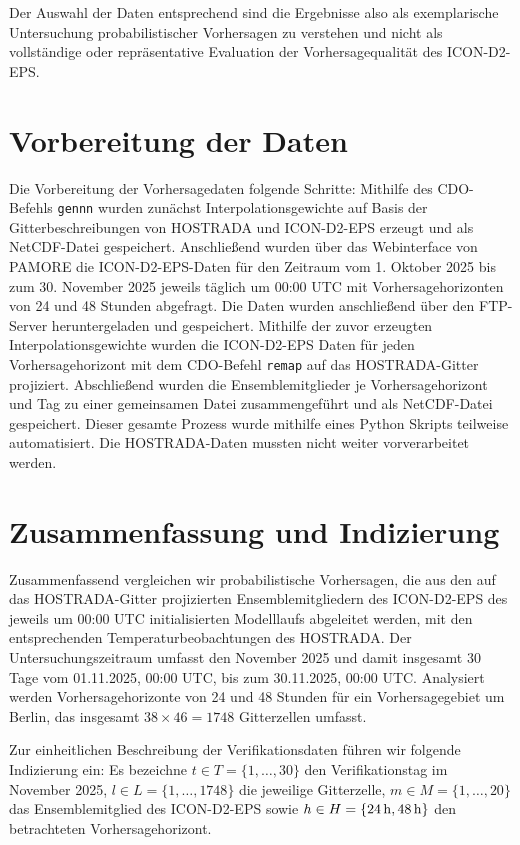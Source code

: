 Der Auswahl der Daten entsprechend sind die Ergebnisse also als exemplarische Untersuchung probabilistischer Vorhersagen zu verstehen und nicht als vollständige oder repräsentative Evaluation der Vorhersagequalität des ICON-D2-EPS.


\section{Vorbereitung der Daten} 
Die Vorbereitung der Vorhersagedaten folgende Schritte: Mithilfe des CDO-Befehls \texttt{gennn} wurden zunächst Interpolationsgewichte auf Basis der Gitterbeschreibungen von HOSTRADA und ICON-D2-EPS erzeugt und als NetCDF-Datei gespeichert. Anschließend wurden über das Webinterface von PAMORE die ICON-D2-EPS-Daten für den Zeitraum vom 1. Oktober 2025 bis zum 30. November 2025 jeweils täglich um 00:00 UTC mit Vorhersagehorizonten von 24 und 48 Stunden abgefragt. Die Daten wurden anschließend über den FTP-Server heruntergeladen und gespeichert. Mithilfe der zuvor erzeugten Interpolationsgewichte wurden die ICON-D2-EPS Daten für jeden Vorhersagehorizont mit dem CDO-Befehl \texttt{remap} auf das HOSTRADA-Gitter projiziert. Abschließend wurden die Ensemblemitglieder je Vorhersagehorizont und Tag zu einer gemeinsamen Datei zusammengeführt und als NetCDF-Datei gespeichert. Dieser gesamte Prozess wurde mithilfe eines Python Skripts teilweise automatisiert. Die HOSTRADA-Daten mussten nicht weiter vorverarbeitet werden.

\section{Zusammenfassung und Indizierung} \label{sec:indx}

Zusammenfassend vergleichen wir probabilistische Vorhersagen, die aus den auf das HOSTRADA-Gitter projizierten Ensemblemitgliedern des ICON-D2-EPS des jeweils um 00:00 UTC initialisierten Modelllaufs abgeleitet werden, mit den entsprechenden Temperaturbeobachtungen des HOSTRADA. Der Untersuchungszeitraum umfasst den November 2025 und damit insgesamt 30 Tage vom 01.11.2025, 00:00 UTC, bis zum 30.11.2025, 00:00 UTC. Analysiert werden Vorhersagehorizonte von 24 und 48 Stunden für ein Vorhersagegebiet um Berlin, das insgesamt $38 \times 46 = 1748$ Gitterzellen umfasst.

Zur einheitlichen Beschreibung der Verifikationsdaten führen wir folgende Indizierung ein: Es bezeichne $t \in T = \{1,\dots,30\}$ den Verifikationstag im November 2025, \mbox{$l \in L = \{1,\dots,1748\}$} die jeweilige Gitterzelle, $m \in M = \{1,\dots,20\}$ das Ensemblemitglied des ICON-D2-EPS sowie $h \in H = \{24\,\mathrm{h}, 48\,\mathrm{h}\}$ den betrachteten Vorhersagehorizont. 

